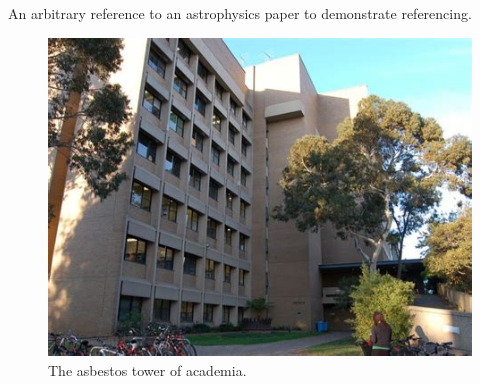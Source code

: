 
An arbitrary reference to an astrophysics paper to demonstrate referencing. \citep{AasiAbadie2013}

\lipsum[1-4]


\begin{figure}[h]
  \centering
  \includegraphics[width=0.9\linewidth]{figures/davidcaro.png}
  \caption{\label{fig:davidcaro} The asbestos tower of academia.}
\end{figure}

\lipsum[5-6]


